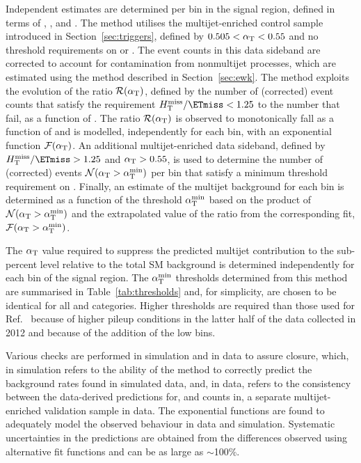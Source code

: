 Independent estimates are determined per bin in the signal region,
defined in terms of \njet, \nb, and \scalht. The method utilises the
multijet-enriched control sample introduced in
Section~\ref{sec:triggers}, defined by $0.505 < \alpha_\mathrm{T} < 0.55$ and no
threshold requirements on \dphi or \mhtmet. The event counts in this
data sideband are corrected to account for contamination from
nonmultijet processes, which are estimated using the method described
in Section~\ref{sec:ewk}. The method exploits the evolution of the
ratio $\mathcal{R}(\alpha_\mathrm{T})$, defined by the number of (corrected)
event counts that satisfy the requirement $\mhtmet < 1.25$ to the
number that fail, as a function of \alphat. The ratio
$\mathcal{R}(\alpha_\mathrm{T})$ is observed to monotonically fall as a function
of \alphat and is modelled, independently for each bin, with an
exponential function $\mathcal{F}(\alpha_\mathrm{T})$. An additional
multijet-enriched data sideband, defined by $\mhtmet > 1.25$ and
$\alpha_\mathrm{T} > 0.55$, is used to determine the number of (corrected)
events $\mathcal{N}(\alpha_\mathrm{T} > \alpha_\mathrm{T}^\text{min})$ per bin that satisfy a
minimum threshold requirement on \alphat. Finally, an estimate of the
multijet background for each bin is determined as a function of the
threshold $\alpha_\mathrm{T}^\text{min}$ based on the product of $\mathcal{N}(\alpha_\mathrm{T} >
\alpha_\mathrm{T}^\text{min})$ and the extrapolated value of the ratio from the
corresponding fit, $\mathcal{F}(\alpha_\mathrm{T} > \alpha_\mathrm{T}^\text{min})$.

The $\alpha_\mathrm{T}$ value required to suppress the predicted multijet
contribution to the sub-percent level relative to the total SM
background is determined independently for each bin of the signal
region. The $\alpha_\mathrm{T}^\text{min}$ thresholds determined from this method are
summarised in Table~\ref{tab:thresholds} and, for simplicity, are
chosen to be identical for all \njet and \nb categories. Higher
\alphat thresholds are required than those used for
Ref.~\cite{RA1Paper2012} because of higher pileup conditions in the
latter half of the data collected in 2012 and because of the addition
of the low \scalht bins.

Various checks are performed in simulation and in data to assure
closure, which, in simulation refers to the ability of the method to
correctly predict the background rates found in simulated data, and,
in data, refers to the consistency between the data-derived
predictions for, and counts in, a separate multijet-enriched
validation sample in data. The exponential functions are found to
adequately model the observed behaviour in data and
simulation. Systematic uncertainties in the predictions are obtained
from the differences observed using alternative fit functions and can
be as large as $\sim$100\%.

